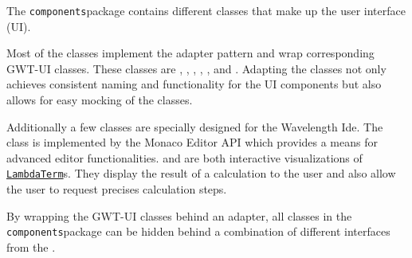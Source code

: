 The \texttt{components}package contains different classes that make up the user interface (UI).

Most of the classes implement the adapter pattern and wrap corresponding GWT-UI classes. 
These classes are \texttt{}, \texttt{}, \texttt{}, 
\texttt{}, \texttt{}, \texttt{} and \texttt{}.
Adapting the classes not only achieves consistent naming and functionality for the UI components
but also allows for easy mocking of the classes.

Additionally a few classes are specially designed for the Wavelength Ide. The \texttt{} 
class is implemented by the Monaco Editor API which provides a means for advanced editor functionalities. 
\texttt{} and \texttt{} are both interactive visualizations of 
\texttt{\hyperref[type:edu.kit.wavelength.client.model.term.LambdaTerm]{LambdaTerm}}s. They display 
the result of a calculation to the user and also allow the user to request precises calculation steps.

By wrapping the GWT-UI classes behind an adapter, all classes in the \texttt{components}package can
be hidden behind a combination of different interfaces from the \texttt{}.
